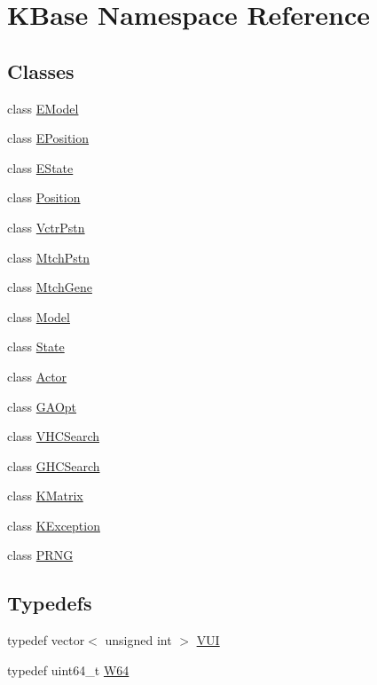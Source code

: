 \hypertarget{namespace_k_base}{\section{K\-Base Namespace Reference}
\label{namespace_k_base}
}
\subsection*{Classes}
\begin{DoxyCompactItemize}
\item 
class \hyperlink{class_k_base_1_1_e_model}{E\-Model}
\item 
class \hyperlink{class_k_base_1_1_e_position}{E\-Position}
\item 
class \hyperlink{class_k_base_1_1_e_state}{E\-State}
\item 
class \hyperlink{class_k_base_1_1_position}{Position}
\item 
class \hyperlink{class_k_base_1_1_vctr_pstn}{Vctr\-Pstn}
\item 
class \hyperlink{class_k_base_1_1_mtch_pstn}{Mtch\-Pstn}
\item 
class \hyperlink{class_k_base_1_1_mtch_gene}{Mtch\-Gene}
\item 
class \hyperlink{class_k_base_1_1_model}{Model}
\item 
class \hyperlink{class_k_base_1_1_state}{State}
\item 
class \hyperlink{class_k_base_1_1_actor}{Actor}
\item 
class \hyperlink{class_k_base_1_1_g_a_opt}{G\-A\-Opt}
\item 
class \hyperlink{class_k_base_1_1_v_h_c_search}{V\-H\-C\-Search}
\item 
class \hyperlink{class_k_base_1_1_g_h_c_search}{G\-H\-C\-Search}
\item 
class \hyperlink{class_k_base_1_1_k_matrix}{K\-Matrix}
\item 
class \hyperlink{class_k_base_1_1_k_exception}{K\-Exception}
\item 
class \hyperlink{class_k_base_1_1_p_r_n_g}{P\-R\-N\-G}
\end{DoxyCompactItemize}
\subsection*{Typedefs}
\begin{DoxyCompactItemize}
\item 
typedef vector$<$ unsigned int $>$ \hyperlink{namespace_k_base_ad8d970208cc99c612b207d7bbbad4434}{V\-U\-I}
\item 
typedef uint64\-\_\-t \hyperlink{namespace_k_base_ad560ba73f29a481837375dfda23dca0d}{W64}
\end{DoxyCompactItemize}
